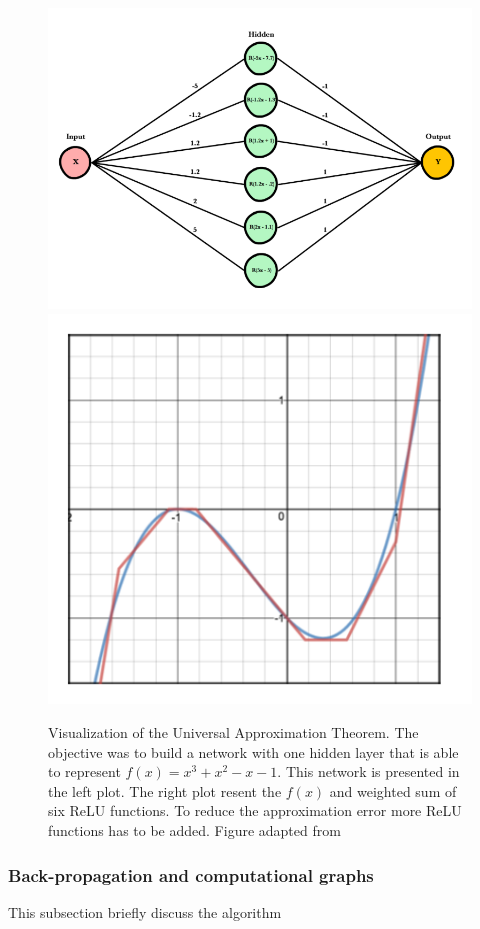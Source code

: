 \begin{figure}[!htb]
 \begin{center}
   \includegraphics[width=0.49\linewidth]{figures/UAT_2.PNG}
    \includegraphics[width=0.49\linewidth]{figures/UAT.PNG}
   \caption[Visualization of the Universal Approximation Theorem]{Visualization of the Universal Approximation Theorem. The objective was to build a network with one hidden layer that is able to represent $f(x)= x^{3}+x^{2}-x-1$. This network is presented in the left plot. The right plot resent the $f(x)$ and weighted sum of six ReLU functions. To reduce the approximation error more ReLU functions has to be added. Figure adapted from \cite{UAT_blog}
     \label{fig:Universal_approx}}
 \end{center}
\end{figure}

\subsubsection{Back-propagation and computational graphs}
This subsection briefly discuss the algorithm 

